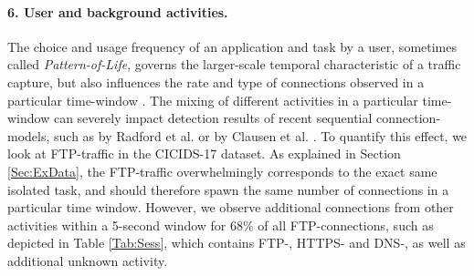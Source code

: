 \documentclass[runningheads]{llncs}
\begin{document}







\paragraph{6. User and background activities.}
The choice and usage frequency of an application and task by a user, sometimes called \textit{Pattern-of-Life}, governs the larger-scale temporal characteristic of a traffic capture, but also influences the rate and type of connections observed in a particular time-window \cite{aparicio2017using}. The mixing of different activities in a particular time-window can severely impact detection results of recent sequential connection-models, such as by Radford et al. \cite{radford2018network} or by Clausen et al. \cite{henryLSTM}. To quantify this effect, we look at FTP-traffic in the CICIDS-17 dataset. As explained in Section \ref{Sec:ExData}, the FTP-traffic overwhelmingly corresponds to the exact same isolated task, and should therefore spawn the same number of connections in a particular time window. However, we observe additional connections from other activities within a 5-second window for $68\%$ of all FTP-connections, such as depicted in Table \ref{Tab:Sess}, which contains FTP-, HTTPS- and DNS-, as well as additional unknown activity.
\end{document}
